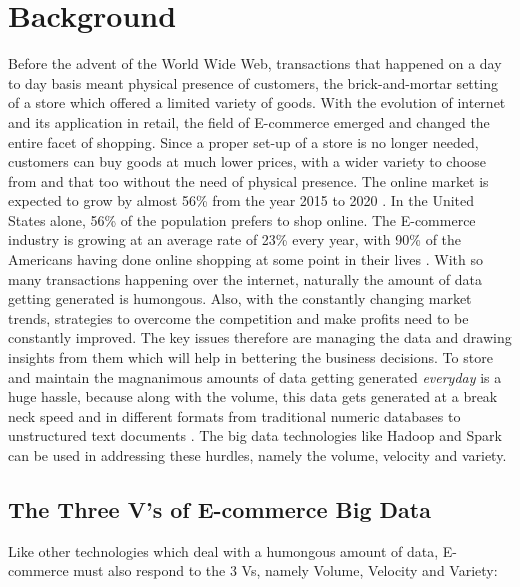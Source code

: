 \section{Background}
Before the advent of the World Wide Web, transactions that happened on a day to day basis meant physical presence of customers, the brick-and-mortar setting of a store which offered a limited variety of goods. With the evolution of internet and its application in retail, the field of E-commerce emerged and changed the entire facet of shopping. Since a proper set-up of a store is no longer needed, customers can buy goods at much lower prices, with a wider variety to choose from and that too without the need of physical presence. The online market is expected to grow by almost 56\% from the year 2015 to 2020 \cite{link2}. In the United States alone, 56\% of the population prefers to shop online. The E-commerce industry is growing at an average rate of 23\% every year, with 90\% of the Americans having done online shopping at some point in their lives \cite{link3}. With so many transactions happening over the internet, naturally the amount of data getting generated is humongous. Also, with the constantly changing market trends, strategies to overcome the competition and make profits need to be constantly improved. The key issues therefore are managing the data and drawing insights from them which will help in bettering the business decisions. To store and maintain the magnanimous amounts of data getting generated \emph{everyday} is a huge hassle, because along with the volume, this data gets generated at a break neck speed and in different formats from traditional numeric databases to unstructured text documents   \cite{link4}. The big data technologies like Hadoop and Spark can be used in addressing these hurdles, namely the volume, velocity and variety.

\subsection{The Three V's of E-commerce Big Data}
Like other technologies which deal with a humongous amount of data, E-commerce must also respond to the 3 Vs, namely Volume, Velocity and Variety:

